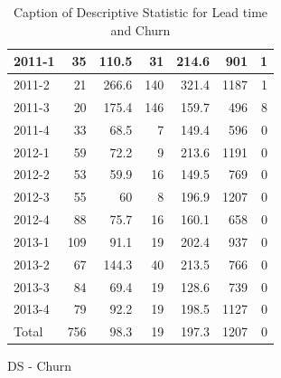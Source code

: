 \documentclass[UKenglish]{ifimaster}  %
\begin{document}
\begin{appendices}
\begin{table}[!htbp]
\begin{adjustwidth}{-2.5cm}{}
\begin{subfigure}[b]{0.3\textwidth}
{\begin{tabular}{ | l | r | r | r | r | r | r | }
 2011-1  & 35 & 110.5 & 31 & 214.6 & 901 & 1 \\ \hline
 2011-2  & 21 & 266.6 & 140 & 321.4 & 1187 & 1 \\ \hline
 2011-3  & 20 & 175.4 & 146 & 159.7 & 496 & 8 \\ \hline
 2011-4  & 33 & 68.5 & 7 & 149.4 & 596 & 0\\ \hline
 2012-1  & 59 & 72.2 & 9 & 213.6 & 1191 & 0\\ \hline
 2012-2  & 53 & 59.9 & 16 & 149.5 & 769 & 0\\ \hline
 2012-3  & 55 & 60 & 8 & 196.9 & 1207 & 0\\ \hline
 2012-4  & 88 & 75.7 & 16 & 160.1 & 658 & 0\\ \hline
 2013-1  & 109 & 91.1 & 19 & 202.4 & 937 & 0\\ \hline
 2013-2  & 67 & 144.3 & 40 & 213.5 & 766 & 0\\ \hline
 2013-3  & 84 & 69.4 & 19 & 128.6 & 739 & 0\\ \hline
 2013-4  & 79 & 92.2 & 19 & 198.5 & 1127 & 0\\ \hline
 Total  & 756 & 98.3 & 19 & 197.3 & 1207 & 0\\ \hline

\end{tabular}
}
\caption{DS - Churn}
 \label{DS:Churn:6}
\end{subfigure}
\end{adjustwidth}
\caption[Optional caption for list of figures]{Caption of Descriptive Statistic for Lead time and Churn}
\label{DS:6:3}
\end{table}


\end{appendices}
\end{document}
